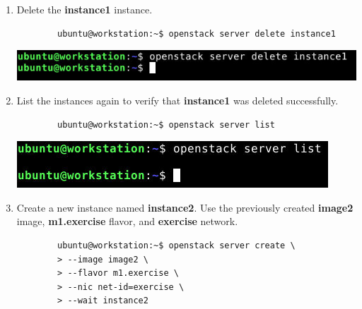 \documentclass[letterpaper, 12pt]{article}
\begin{document}
\begin{enumerate}
    \item Delete the \textbf{instance1} instance.
    \begin{lstlisting}
        ubuntu@workstation:~$ openstack server delete instance1
    \end{lstlisting}

    \begin{center}
        \includegraphics[width=\linewidth]{images/part4/step10.png}
    \end{center}

    \item List the instances again to verify that \textbf{instance1} was deleted successfully.
    \begin{lstlisting}
        ubuntu@workstation:~$ openstack server list
    \end{lstlisting}

    \begin{center}
        \includegraphics[width=\linewidth]{images/part4/step11.png}
    \end{center}

    \item Create a new instance named \textbf{instance2}. Use the previously created \textbf{image2} image,
    \textbf{m1.exercise} flavor, and \textbf{exercise} network.
    \begin{lstlisting}
        ubuntu@workstation:~$ openstack server create \
        > --image image2 \
        > --flavor m1.exercise \
        > --nic net-id=exercise \
        > --wait instance2
    \end{lstlisting}


\end{enumerate}
\end{document}
